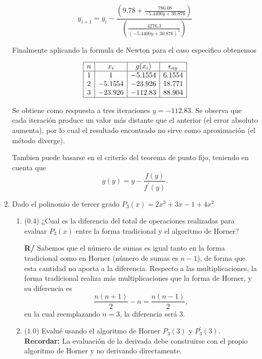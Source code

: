 \documentclass[12pt]{article}
\begin{document}
\begin{enumerate}[leftmargin=*,widest=9]
\begin{equation}
y_{i+1} = y_i - \frac{\left(9.78 + \frac{786.08}{- 5.4400 y + 30.876} \right)}{\left( \frac{4276.3}{\left(- 5.4400 y + 30.876\right)^{2}} \right)} \label{ec_newton}
\end{equation}

Finalmente aplicando la formula de Newton para el caso especifico obtenemos

\begin{equation*}
\begin{array}{|c|c|c|c|}
\hline
n & x_i & g(x_i) & \epsilon_{ay} \\
\hline
1 & 1 & -5.1554 & 6.1554 \\
2 & -5.1554 & -23.926 & 18.771\\
3 & -23.926 & -112.83 & 88.904\\
\hline
\end{array}
\end{equation*}

Se obtiene como respuesta a tres iteraciones \(y = -112.83\). Se observa que cada iteración produce un valor más distante que el anterior (el error absoluto aumenta), por lo cual el resultado encontrado no sirve como aproximación (el método diverge).

Tambien puede basarse en el criterio del teorema de punto fijo, teniendo en cuenta que \[ g(y) = y - \frac{f(y)}{f^{\prime}(y)}. \]


    \item Dado el polinomio de tercer grado \(P_3(x) = 2x^3 + 3x - 1 + 4x^2\) 
    
    \begin{enumerate}[label=\alph*]
    \item (\(0.4\)) ¿Cual es la diferencia del total de operaciones realizadas para evaluar \(P_3(x)\) entre la forma tradicional y el algoritmo de Horner?
    
   \textbf{R/} Sabemos que el número de sumas es igual tanto en la forma tradicional como en Horner (número de sumas es \(n-1\)), de forma que esta cantidad no aporta a la diferencia. Respecto a las multiplicaciones, la forma tradicional realiza más multiplicaciones que la forma de Horner, y su diferencia es
   \[ \frac{n(n+1)}{2} - n = \frac{n(n-1)}{2},\]
   en la cual reemplazando \(n= 3\), la diferencia será \(3\).

    \item (\(1.0\)) Evalué usando el algoritmo de Horner \(P_3(3)\) y \(P^\prime_3(3)\). \textbf{Recordar:} La evaluación de la derivada debe construirse con el propio algoritmo de Horner y no derivando directamente.
    

\end{enumerate}
\end{enumerate}
\end{document}
